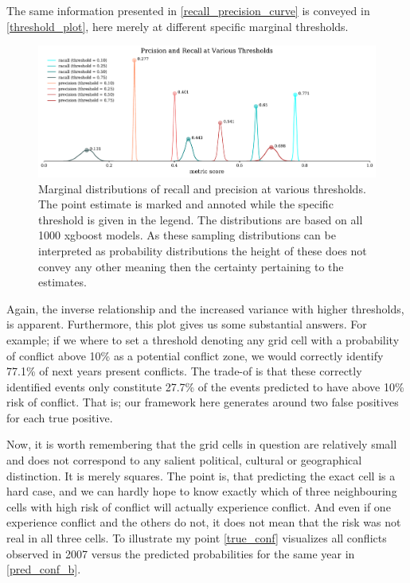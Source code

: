 \documentclass[a4paper]{article}
\begin{document}
The same information presented in \autoref{recall_precision_curve} is conveyed in \autoref{threshold_plot}, here merely at different specific marginal thresholds.\par

\begin{figure}[!htb]
	\centering
	\includegraphics[scale=0.5]{threshold_plot.pdf}
    \caption{\footnotesize{Marginal distributions of recall and precision at various thresholds. The point estimate is marked and annoted while the specific threshold is given in the legend. The distributions are based on all 1000 xgboost models. As these sampling distributions can be interpreted as probability distributions the height of these does not convey any other meaning then the certainty pertaining to the estimates.}}\label{threshold_plot}
\end{figure}

Again, the inverse relationship and the increased variance with higher thresholds, is apparent. Furthermore, this plot gives us some substantial answers. For example; if we where to set a threshold denoting any grid cell with a probability of conflict above 10\% as a potential conflict zone, we would correctly identify 77.1\% of next years present conflicts. The trade-of is that these correctly identified events only constitute 27.7\% of the events predicted to have above 10\% risk of conflict. That is; our framework here generates around two false positives for each true positive.\par

Now, it is worth remembering that the grid cells in question are relatively small and does not correspond to any salient political, cultural or geographical distinction. It is merely squares. The point is, that predicting the exact cell is a hard case, and we can hardly hope to know exactly which of three neighbouring cells with high risk of conflict will actually experience conflict. And even if one experience conflict and the others do not, it does not mean that the risk was not real in all three cells. To illustrate my point \autoref{true_conf} visualizes all conflicts observed in 2007 versus the predicted probabilities for the same year in \autoref{pred_conf_b}.\par
\end{document}
